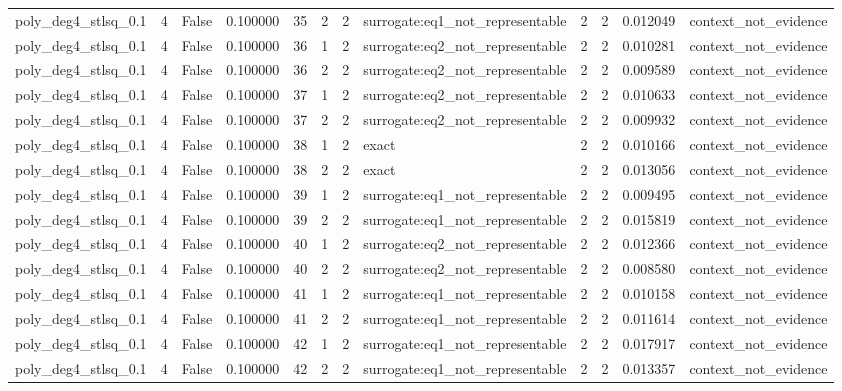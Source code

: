 \begin{tabular}{lrrrrrrlrrrl}
poly\_deg4\_stlsq\_0.1 & 4 & False & 0.100000 & 35 & 2 & 2 & surrogate:eq1\_not\_representable & 2 & 2 & 0.012049 & context\_not\_evidence \\
poly\_deg4\_stlsq\_0.1 & 4 & False & 0.100000 & 36 & 1 & 2 & surrogate:eq2\_not\_representable & 2 & 2 & 0.010281 & context\_not\_evidence \\
poly\_deg4\_stlsq\_0.1 & 4 & False & 0.100000 & 36 & 2 & 2 & surrogate:eq2\_not\_representable & 2 & 2 & 0.009589 & context\_not\_evidence \\
poly\_deg4\_stlsq\_0.1 & 4 & False & 0.100000 & 37 & 1 & 2 & surrogate:eq2\_not\_representable & 2 & 2 & 0.010633 & context\_not\_evidence \\
poly\_deg4\_stlsq\_0.1 & 4 & False & 0.100000 & 37 & 2 & 2 & surrogate:eq2\_not\_representable & 2 & 2 & 0.009932 & context\_not\_evidence \\
poly\_deg4\_stlsq\_0.1 & 4 & False & 0.100000 & 38 & 1 & 2 & exact & 2 & 2 & 0.010166 & context\_not\_evidence \\
poly\_deg4\_stlsq\_0.1 & 4 & False & 0.100000 & 38 & 2 & 2 & exact & 2 & 2 & 0.013056 & context\_not\_evidence \\
poly\_deg4\_stlsq\_0.1 & 4 & False & 0.100000 & 39 & 1 & 2 & surrogate:eq1\_not\_representable & 2 & 2 & 0.009495 & context\_not\_evidence \\
poly\_deg4\_stlsq\_0.1 & 4 & False & 0.100000 & 39 & 2 & 2 & surrogate:eq1\_not\_representable & 2 & 2 & 0.015819 & context\_not\_evidence \\
poly\_deg4\_stlsq\_0.1 & 4 & False & 0.100000 & 40 & 1 & 2 & surrogate:eq2\_not\_representable & 2 & 2 & 0.012366 & context\_not\_evidence \\
poly\_deg4\_stlsq\_0.1 & 4 & False & 0.100000 & 40 & 2 & 2 & surrogate:eq2\_not\_representable & 2 & 2 & 0.008580 & context\_not\_evidence \\
poly\_deg4\_stlsq\_0.1 & 4 & False & 0.100000 & 41 & 1 & 2 & surrogate:eq1\_not\_representable & 2 & 2 & 0.010158 & context\_not\_evidence \\
poly\_deg4\_stlsq\_0.1 & 4 & False & 0.100000 & 41 & 2 & 2 & surrogate:eq1\_not\_representable & 2 & 2 & 0.011614 & context\_not\_evidence \\
poly\_deg4\_stlsq\_0.1 & 4 & False & 0.100000 & 42 & 1 & 2 & surrogate:eq1\_not\_representable & 2 & 2 & 0.017917 & context\_not\_evidence \\
poly\_deg4\_stlsq\_0.1 & 4 & False & 0.100000 & 42 & 2 & 2 & surrogate:eq1\_not\_representable & 2 & 2 & 0.013357 & context\_not\_evidence \\

\end{tabular}
